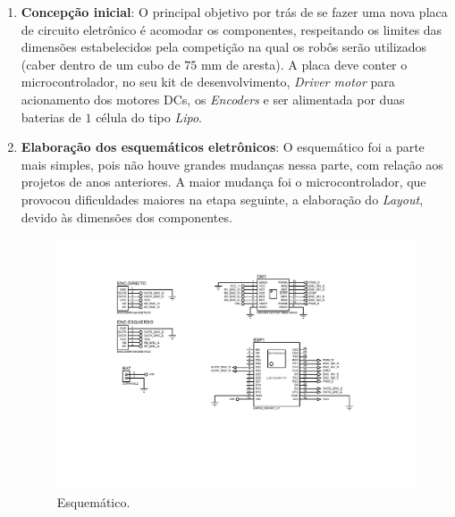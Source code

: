 \begin{enumerate}
    \item \textbf{Concepção inicial}:
        O principal objetivo por trás de se fazer uma nova placa de circuito eletrônico é acomodar os componentes, respeitando os limites das dimensões estabelecidos pela competição na qual os robôs serão utilizados (caber dentro de um cubo de $75$ mm de aresta). A placa deve conter o microcontrolador, no seu kit de desenvolvimento, \textit{Driver motor} para acionamento dos motores DCs, os \textit{Encoders} e ser alimentada por duas baterias de $1$ célula do tipo \textit{Lipo}.
        
    \item \textbf{Elaboração dos esquemáticos eletrônicos}:
        O esquemático foi a parte mais simples, pois não houve grandes mudanças nessa parte, com relação aos projetos de anos anteriores. A maior mudança foi o microcontrolador, que provocou dificuldades maiores na etapa seguinte, a elaboração do \textit{Layout}, devido às dimensões dos componentes.
        
        
        \begin{figure}[H]
            \centering
            \includegraphics[width=\textwidth]{imagens/eletronica/placa/esquematico_completo.pdf}
            \caption{Esquemático.}
        \end{figure}
        

\end{enumerate}
